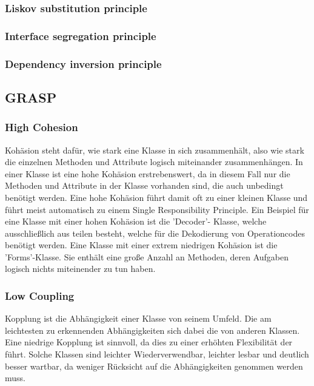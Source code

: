 \documentclass[12pt,a4paper,titlepage,ngerman,pdftex]{report}
\begin{document}
    \subsubsection{Liskov substitution principle}

    \subsubsection{Interface segregation principle}

    \subsubsection{Dependency inversion principle}

    \subsection{GRASP}

    \subsubsection{High Cohesion}

    Kohäsion steht dafür, wie stark eine Klasse in sich zusammenhält, also wie stark die einzelnen Methoden und Attribute logisch miteinander zusammenhängen. In einer Klasse ist eine hohe Kohäsion erstrebenswert, da in diesem Fall nur die Methoden und Attribute in der Klasse vorhanden sind, die auch unbedingt benötigt werden.
    Eine hohe Kohäsion führt damit oft zu einer kleinen Klasse und führt meist automatisch zu einem Single Responsibility Principle. Ein Beispiel für eine Klasse mit einer hohen Kohäsion ist die 'Decoder'- Klasse, welche ausschließlich aus teilen besteht, welche für die Dekodierung von Operationcodes benötigt werden. 
    Eine Klasse mit einer extrem niedrigen Kohäsion ist die 'Forms'-Klasse. Sie enthält eine große Anzahl an Methoden, deren Aufgaben logisch nichts miteinender zu tun haben.  

    \subsubsection{Low Coupling}
    
    Kopplung ist die Abhängigkeit einer Klasse von seinem Umfeld. Die am leichtesten zu erkennenden Abhängigkeiten sich dabei die von anderen Klassen. Eine niedrige Kopplung ist sinnvoll, da dies zu einer erhöhten Flexibilität der führt. Solche Klassen sind leichter Wiederverwendbar, leichter lesbar und deutlich besser wartbar, da weniger Rücksicht auf die Abhängigkeiten genommen werden muss. 
\end{document}
